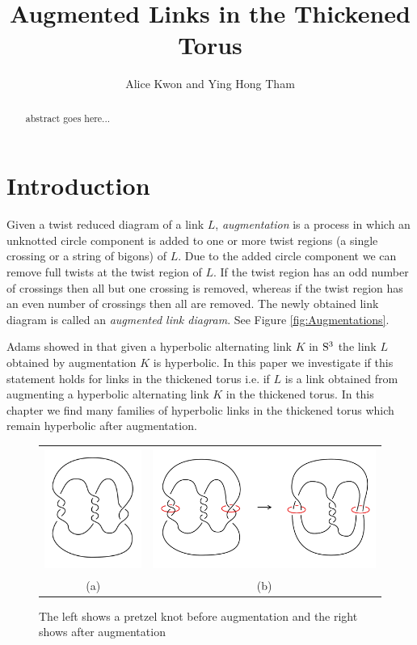 \documentclass[11pt]{amsart}
\title [Augmented Links in the Thickened Torus] {Augmented Links in the Thickened Torus}
\author[Alice Kwon and Ying Hong Tham]{Alice Kwon and Ying Hong Tham}
\newcommand{\Sp}{{\rm{S}}}
\theoremstyle{plain}
\theoremstyle{definition}
\begin{document}
\maketitle

\begin{abstract}
  abstract goes here...
\end{abstract}

\section{Introduction}

Given a twist reduced diagram of a link $L$, {\it augmentation} is a process in which an unknotted circle component is added to one or more twist regions (a single crossing or a string of bigons) of $L$. Due to the added circle component we can remove full twists at the twist region of $L$. If the twist region has an odd number of crossings then all but one crossing is removed, whereas if the twist region has an even number of crossings then all are removed. The newly obtained link diagram is called an {\it augmented link diagram}. See Figure \ref{fig:Augmentations}.

Adams showed in \cite{CA} that given a hyperbolic alternating link $K$ in $\Sp^3$ the link $L$ obtained by augmentation $K$ is hyperbolic. In this paper we investigate if this statement holds for links in the thickened torus i.e. if $L$ is a link obtained from augmenting a hyperbolic alternating link $K$ in the thickened torus. In this chapter we find many families of hyperbolic links in the thickened torus which remain hyperbolic after augmentation. 
 \begin{figure}
 \centering  
 \begin{tabular}{cc}
 \includegraphics [height=4cm]{augmentation1}&
  \includegraphics [height=4cm]{augmentation2}\\
  (a)&(b)
  \end{tabular}
 \caption{The left shows a pretzel knot before augmentation and the right shows after augmentation}
 \label{fig:augmentationS3}
 \end{figure}
 
\end{document}
